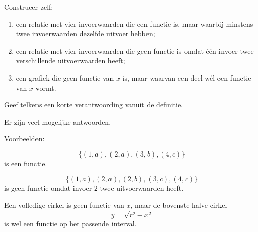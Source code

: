 \documentclass{ximera}
\begin{document}
\begin{oefening}{\oefG}

Construeer zelf:

\begin{enumerate}
    \item een relatie met vier invoerwaarden die een functie is,
          maar waarbij minstens twee invoerwaarden dezelfde uitvoer hebben;
    \item een relatie met vier invoerwaarden die geen functie is omdat één invoer
          twee verschillende uitvoerwaarden heeft;
    \item een grafiek die geen functie van \(x\) is, maar waarvan een deel wél
          een functie van \(x\) vormt.
\end{enumerate}

Geef telkens een korte verantwoording vanuit de definitie.

\begin{oplossing}
Er zijn veel mogelijke antwoorden.

Voorbeelden:

\[
\{(1,a),(2,a),(3,b),(4,c)\}
\]
is een functie.

\[
\{(1,a),(2,a),(2,b),(3,c),(4,c)\}
\]
is geen functie omdat invoer \(2\) twee uitvoerwaarden heeft.

Een volledige cirkel is geen functie van \(x\), maar de bovenste halve cirkel
\[
y=\sqrt{r^2-x^2}
\]
is wel een functie op het passende interval.
\end{oplossing}

\end{oefening}

\end{document}
